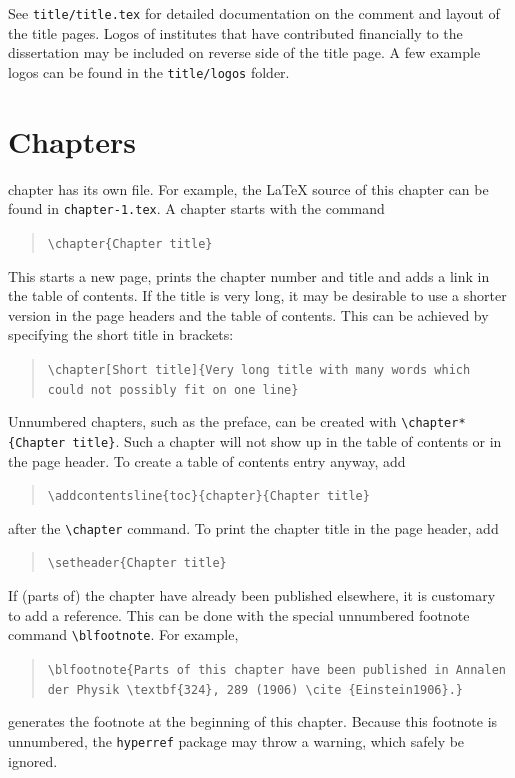 See \texttt{title/title.tex} for detailed documentation on the comment and layout of the title pages. Logos of institutes that have contributed financially to the dissertation may be included on reverse side of the title page. A few example logos can be found in the \texttt{title/logos} folder.

\section{Chapters}

 chapter has its own file. For example, the \LaTeX{} source of this chapter can be found in \texttt{chapter-1.tex}. A chapter starts with the command

\begin{quote}
\texttt{\textbackslash chapter\{Chapter title\}}
\end{quote}
This starts a new page, prints the chapter number and title and adds a link in the table of contents. If the title is very long, it may be desirable to use a shorter version in the page headers and the table of contents. This can be achieved by specifying the short title in brackets:

\begin{quote}
\texttt{\textbackslash chapter[Short title]\{Very long title with many words which could not possibly fit on one line\}}
\end{quote}
Unnumbered chapters, such as the preface, can be created with \texttt{\textbackslash chapter*\{Chapter title\}}. Such a chapter will not show up in the table of contents or in the page header. To create a table of contents entry anyway, add
\begin{quote}
    \texttt{\textbackslash addcontentsline\{toc\}\{chapter\}\{Chapter title\}}
\end{quote}
after the \texttt{\textbackslash chapter} command. To print the chapter title in the page header, add
\begin{quote}
    \texttt{\textbackslash setheader\{Chapter title\}}
\end{quote}

If (parts of) the chapter have already been published elsewhere, it is customary to add a reference. This can be done with the special unnumbered footnote command \texttt{\textbackslash blfootnote}. For example,

\begin{quote}
\texttt{\textbackslash blfootnote\{Parts of this chapter have been published in Annalen der Physik \textbackslash textbf\{324\}, 289 (1906) \textbackslash cite \{Einstein1906\}.\}}
\end{quote}
generates the footnote at the beginning of this chapter. Because this footnote is unnumbered, the \texttt{hyperref} package may throw a warning, which safely be ignored.

